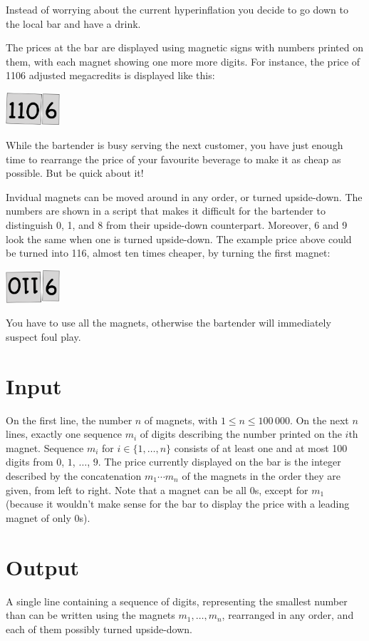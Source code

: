 

Instead of worrying about the current hyperinflation you decide to go down to the local bar and have a drink.

The prices at the bar are displayed using magnetic signs with numbers printed on them, with each magnet showing one more more digits.
For instance, the price of 1106 adjusted megacredits is displayed like this:

\medskip
\includegraphics[width = 2cm]{img/from.png}

While the bartender is busy serving the next customer, you have just enough time to rearrange the price of your favourite beverage to make it as cheap as possible.
But be quick about it!

Invidual magnets can be moved around in any order, or turned upside-down.
The numbers are shown in a script that makes it difficult for the bartender to distinguish 0, 1, and 8 from their upside-down counterpart.
Moreover, 6 and 9 look the same when one is turned upside-down.
The example price above could be turned into 116, almost ten times cheaper, by turning the first magnet:

\medskip
\includegraphics[width = 2cm]{img/to.png}

You have to use all the magnets, otherwise the bartender will immediately suspect foul play.

\section*{Input}

On the first line, the number $n$ of magnets, with $1\leq n\leq 100\,000$.
On the next $n$ lines, exactly one sequence $m_i$ of digits describing the number printed on the $i$th magnet.
Sequence $m_i$ for $i\in \{1,\ldots, n\}$ consists of at least one and at most 100 digits from $0$, $1$, $\ldots$, $9$.
The price currently displayed on the bar is the integer described by the concatenation $m_1\cdots m_n$ of the magnets in the order they are given, from left to right.
Note that a magnet can be all $0$s, except for $m_1$ (because it wouldn't make sense for the bar to display the price with a leading magnet of only $0$s).

\section*{Output}

A single line containing a sequence of digits, representing the smallest number than can be written using the magnets $m_1,\ldots,m_n$, rearranged in any order, and each of them possibly turned upside-down.
